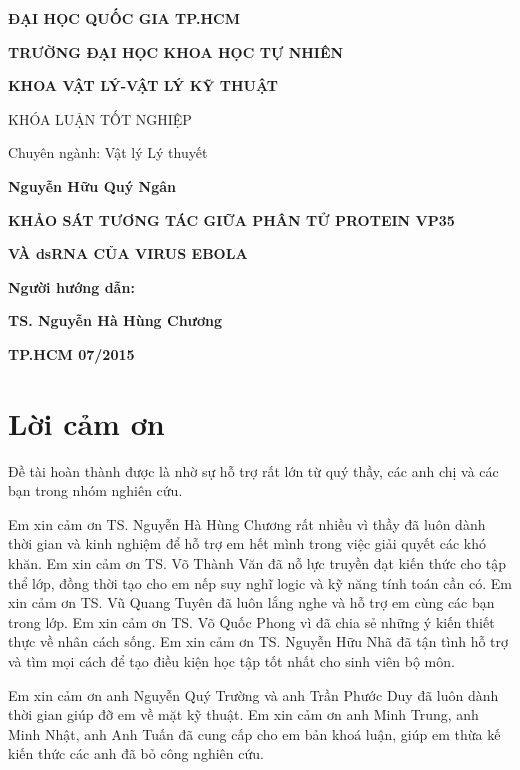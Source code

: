 \documentclass[12pt,a4paper,reqno, oneside]{book}
\begin{document}
\newpage
\begin{titlepage}
\centerline{\bf ĐẠI HỌC QUỐC GIA TP.HCM}
\centerline{\bf TRƯỜNG ĐẠI HỌC KHOA HỌC TỰ NHIÊN}
\centerline{\bf KHOA VẬT LÝ-VẬT LÝ KỸ THUẬT}
\vspace*{1cm}
\centerline{KHÓA LUẬN TỐT NGHIỆP}
\centerline{Chuyên ngành: Vật lý Lý thuyết}
\vspace*{1cm}
\centerline{\bf Nguyễn Hữu Quý Ngân}
\vspace*{3cm}
\centerline{\Large\bf KHẢO SÁT TƯƠNG TÁC GIỮA PHÂN TỬ PROTEIN VP35}
\vspace*{0.5cm}
\centerline{\Large\bf VÀ dsRNA CỦA VIRUS EBOLA}
\vspace*{4cm}
\centerline{\bf Người hướng dẫn: }
\centerline{\bf TS. Nguyễn Hà Hùng Chương}
\vfill
\centerline{\bf TP.HCM 07/2015}
\end{titlepage}

\pagestyle{plain}
%

\cleardoublepage%
\pagestyle{fancy}
\tableofcontents
\clearpage

\newpage
{}
\chapter*{Lời cảm ơn}
Đề tài hoàn thành được là nhờ sự hỗ trợ rất lớn từ quý thầy, các anh chị và các bạn trong nhóm nghiên cứu.

Em xin cảm ơn TS. Nguyễn Hà Hùng Chương rất nhiều vì thầy đã luôn dành thời gian và kinh nghiệm để hỗ trợ em hết mình trong việc giải quyết các khó khăn. Em xin cảm ơn TS. Võ Thành Văn đã nỗ lực truyền đạt kiến thức cho tập thể lớp, đồng thời tạo cho em nếp suy nghĩ logic và kỹ năng tính toán cần có. Em xin cảm ơn TS. Vũ Quang Tuyên đã luôn lắng nghe và hỗ trợ em cùng các bạn trong lớp. Em xin cảm ơn TS. Võ Quốc Phong vì đã chia sẻ những ý kiến thiết thực về nhân cách sống. Em xin cảm ơn TS. Nguyễn Hữu Nhã đã tận tình hỗ trợ và tìm mọi cách để tạo điều kiện học tập tốt nhất cho sinh viên bộ môn.

Em xin cảm ơn anh Nguyễn Quý Trường và anh Trần Phước Duy đã luôn dành thời gian giúp đỡ em về mặt kỹ thuật. Em xin cảm ơn anh Minh Trung, anh Minh Nhật, anh Anh Tuấn đã cung cấp cho em bản khoá luận, giúp em thừa kế kiến thức các anh đã bỏ công nghiên cứu.
\end{document}
